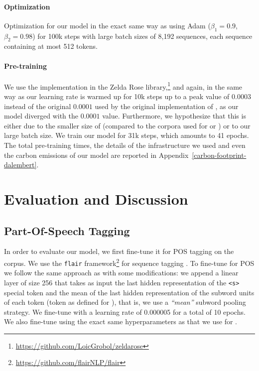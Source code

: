 \paragraph{Optimization}
Optimization for our model in the exact same way as \citep{liu-etal-2019-roberta} using Adam \citep{kingma-ba-2015-adam} ($\beta_1 = 0.9$, $\beta_2 = 0.98$) for 100k steps with large batch sizes of 8,192 sequences, each sequence containing at most 512 tokens.

\paragraph{Pre-training}
We use the \roberta implementation in the Zelda Rose library,\footnote{\url{https://github.com/LoicGrobol/zeldarose}} and again, in the same way as \citet{liu-etal-2019-roberta} our learning rate is warmed up for 10k steps up to a peak value of $0.0003$ instead of the original $0.0001$ used by the original implementation of \roberta \citep{liu-etal-2019-roberta}, as our model diverged with the $0.0001$ value. Furthermore, we hypothesize that this is either due to the smaller size of \freemmax (compared to the corpora used for \roberta or \camembert) or to our large batch size. We train our model for 31k steps, which amounts to 41 epochs. The total pre-training times, the details of the infrastructure we used and even the carbon emissions of our model are reported in Appendix~\ref{carbon-footprint-dalembert}.

\section{Evaluation and Discussion}

\subsection{Part-Of-Speech Tagging}

In order to evaluate our \dalembert model, we first fine-tune it for POS tagging on the \freemlpm corpus. We use the \texttt{flair} framework\footnote{\url{https://github.com/flairNLP/flair}} for sequence tagging \citep{akbik-etal-2019-flair}. To fine-tune \dalembert for POS we follow the same approach as \citet{schweter-akbik-2020-flert} with some modifications: we append a linear layer of size 256 that takes as input the last hidden representation of the \texttt{<s>} special token and the mean of the last hidden representation of the subword units of each token (token as defined for \freemlpm), that is, we use a \emph{``mean''} subword pooling strategy. We fine-tune \dalembert with a learning rate of 0.000005 for a total of 10 epochs. We also fine-tune \camembert using the exact same hyperparameters as that we use for \dalembert.

